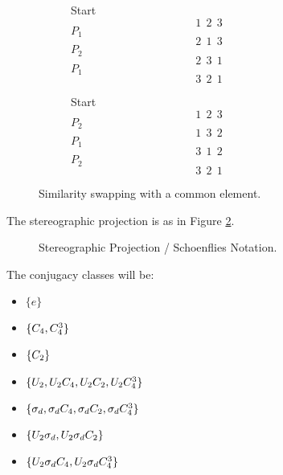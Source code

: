 \begin{alphaparts}
        \begin{figure}
            \centering
            \begin{subfigure}[b]{0.3\textwidth}
                \raggedright
                Start\\
                $$1~~2~~3$$
                $P_1$\\
                $$2~~1~~3$$
                $P_2$\\
                $$2~~3~~1$$
                $P_1$\\
                $$3~~2~~1$$
            \end{subfigure}\hspace{1cm}
            \hspace{3cm}
            \begin{subfigure}[b]{0.3\textwidth}
                \raggedright
                Start\\
                $$1~~2~~3$$
                $P_2$\\
                $$1~~3~~2$$
                $P_1$\\
                $$3~~1~~2$$
                $P_2$\\
                $$3~~2~~1$$
            \end{subfigure}
            \caption{Similarity swapping with a common element.}
            \label{fig:aiswap}
        \end{figure}

    \questionpart
    The stereographic projection is as in Figure \ref{fig:schoen}.

    \begin{figure}[ht]
        \centering
        \scalebox{0.5}{}
        \caption{Stereographic Projection / Schoenflies Notation.}
        \label{fig:schoen}
    \end{figure}

    The conjugacy classes will be:
    \begin{itemize}
        \item $\{e\}$
        \item $\{C_{4}, C_{4}^{3}\}$
        \item $\{C_{2}\}$
        \item $\{U_{2}, U_{2}C_{4}, U_{2}C_{2}, U_{2}C_{4}^{3}\}$
        \item $\{\sigma_{d}, \sigma_{d}C_{4}, \sigma_{d}C_{2}, \sigma_{d}C_{4}^{3}\}$
        \item $\{U_{2}\sigma_{d}, U_{2}\sigma_{d}C_{2}\}$
        \item $\{U_{2}\sigma_{d}C_{4}, U_{2}\sigma_{d}C_{4}^{3}\}$
    \end{itemize}

\end{alphaparts}